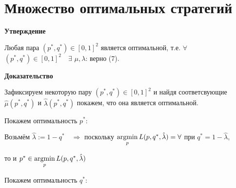 \section{Множество оптимальных стратегий}

\textbf{Утверждение}

Любая пара $(p^{*}, q^{*}) \in [0, 1]^{2}$ является оптимальной, т.е.  
$\forall$ $(p^{*}, q^{*}) \in [0, 1]^{2} \quad \exists$ $\mu, \lambda$: верно (7).
\vspace{5mm}

\textbf{Доказательство}

Зафиксируем некоторую пару  $(p^{*}, q^{*}) \in [0, 1]^{2}$ и найдя соответсвующие $\hat{\mu}(p^{*}, q^{*})$
 и $\hat{\lambda}(p^{*}, q^{*})$ покажем, что она является оптимальной.

 Покажем оптимальность $p^{*}$:

Возьмём $\hat{\lambda}:=1-q^{*} \quad \Rightarrow$  поскольку 
$\operatorname*{argmin}\limits_{p}L(p,q^{*},\hat{\lambda})=\forall$ при $ q^{*}=1-\hat{\lambda}$,

то и $p^{*} \in \operatorname*{argmin}\limits_{p} L(p,q^{*},\hat{\lambda})$


 Покажем оптимальность $q^{*}$:

